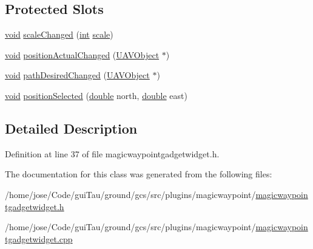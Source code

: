 \subsection*{Protected Slots}
\begin{DoxyCompactItemize}
\item 
\hyperlink{group___u_a_v_objects_plugin_ga444cf2ff3f0ecbe028adce838d373f5c}{void} \hyperlink{group___g_c_s_control_gadget_plugin_ga9cebbe1d3a653c8385f5fdc70345efd6}{scale\-Changed} (\hyperlink{ioapi_8h_a787fa3cf048117ba7123753c1e74fcd6}{int} \hyperlink{glext_8h_a281421b881aa7a1266842b73a3bc7655}{scale})
\item 
\hyperlink{group___u_a_v_objects_plugin_ga444cf2ff3f0ecbe028adce838d373f5c}{void} \hyperlink{group___g_c_s_control_gadget_plugin_gaa10cdac61400db1034c7954b3c549824}{position\-Actual\-Changed} (\hyperlink{class_u_a_v_object}{U\-A\-V\-Object} $\ast$)
\item 
\hyperlink{group___u_a_v_objects_plugin_ga444cf2ff3f0ecbe028adce838d373f5c}{void} \hyperlink{group___g_c_s_control_gadget_plugin_ga3270e904f313cabdad8a5048009ceb25}{path\-Desired\-Changed} (\hyperlink{class_u_a_v_object}{U\-A\-V\-Object} $\ast$)
\item 
\hyperlink{group___u_a_v_objects_plugin_ga444cf2ff3f0ecbe028adce838d373f5c}{void} \hyperlink{group___g_c_s_control_gadget_plugin_ga8735baaf13101dbe0dafb3dc84d83efd}{position\-Selected} (\hyperlink{_super_l_u_support_8h_a8956b2b9f49bf918deed98379d159ca7}{double} north, \hyperlink{_super_l_u_support_8h_a8956b2b9f49bf918deed98379d159ca7}{double} east)
\end{DoxyCompactItemize}


\subsection{Detailed Description}


Definition at line 37 of file magicwaypointgadgetwidget.\-h.



The documentation for this class was generated from the following files\-:\begin{DoxyCompactItemize}
\item 
/home/jose/\-Code/gui\-Tau/ground/gcs/src/plugins/magicwaypoint/\hyperlink{magicwaypointgadgetwidget_8h}{magicwaypointgadgetwidget.\-h}\item 
/home/jose/\-Code/gui\-Tau/ground/gcs/src/plugins/magicwaypoint/\hyperlink{magicwaypointgadgetwidget_8cpp}{magicwaypointgadgetwidget.\-cpp}\end{DoxyCompactItemize}
